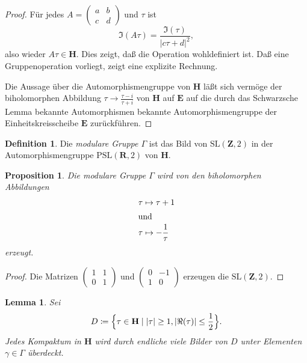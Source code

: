 \documentclass[a4paper,twoside,openright]{report}
\newtheorem{prop}[thm]{Proposition}
\newtheorem{lem}[thm]{Lemma}
\theoremstyle{definition}
\newtheorem{dfn}[thm]{Definition}
\theoremstyle{remark}
\begin{document}
\begin{proof}
  Für jedes $A = (\begin{smallmatrix} a & b \\ c & d\end{smallmatrix})$ und $\tau$
  ist
  \[
    \Im(A \tau) = \frac{\Im(\tau)}{|c \tau + d|^2},
  \]
  also wieder $A \tau \in \mathbf H$.
  Dies zeigt, daß die Operation wohldefiniert ist. Daß eine Gruppenoperation
  vorliegt, zeigt eine explizite Rechnung.
  
  Die Aussage über die Automorphismengruppe von $\mathbf H$ läßt sich vermöge
  der biholomorphen Abbildung $\tau \to \frac{\tau - i}{\tau + i}$ von $\mathbf H$
  auf $\mathbf E$
  auf die durch das Schwarzsche Lemma bekannte Automorphismen bekannte Automorphismengruppe
  der Einheitskreisscheibe $\mathbf E$ zurückführen. 
\end{proof}

\begin{dfn}
  Die \emph{modulare Gruppe $\Gamma$} ist das Bild von $\mathrm{SL}(\mathbf Z, 2)$
  in der Automorphismengruppe $\mathrm{PSL}(\mathbf R, 2)$ von $\mathbf H$. 
\end{dfn}

\begin{prop}
  Die modulare Gruppe $\Gamma$ wird von den biholomorphen Abbildungen
  \begin{align*}
    \tau & \mapsto \tau + 1 \\
    \intertext{und}
    \tau & \mapsto - \frac 1 {\tau}
  \end{align*}
  erzeugt.
\end{prop}

\begin{proof}
  Die Matrizen $(\begin{smallmatrix} 1 & 1 \\ 0 & 1\end{smallmatrix})$ und
  $(\begin{smallmatrix} 0 & -1 \\ 1 & 0\end{smallmatrix})$ erzeugen die
  $\mathrm{SL}(\mathbf Z, 2)$.
\end{proof}

\begin{lem}
  \label{lem:modular_group}
  Sei 
  \[
    D \coloneqq \Bigl\{\tau \in \mathbf H \mid |\tau| \ge 1, |\Re(\tau)| \leq \frac 1 2\Bigr\}.
  \]
  Jedes Kompaktum in $\mathbf H$ wird durch endliche viele Bilder von $D$ unter
  Elementen $\gamma \in \Gamma$ überdeckt.
\end{lem}
\end{document}
